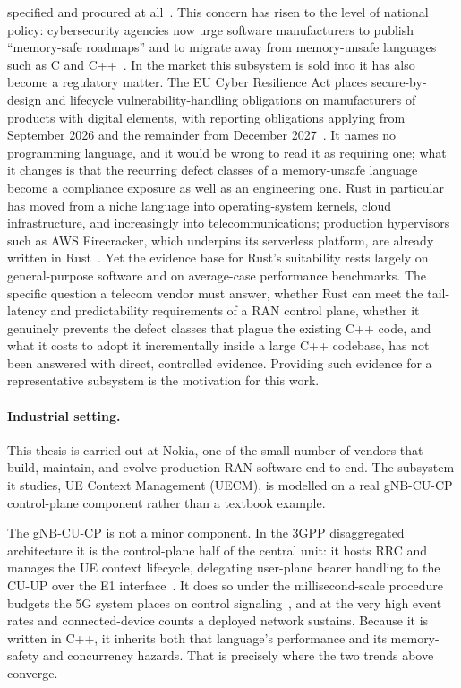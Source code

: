 \documentclass[english,twoside,openright,a4paper,censored,csm,software-track-2020]{HYthesisML}
\begin{document}
specified and procured at all~\cite{watson2025memorysafety}. This concern has risen to the level of national
policy: cybersecurity agencies now urge software manufacturers to publish ``memory-safe
roadmaps'' and to migrate away from memory-unsafe languages such as C and
C++~\cite{cisa2023memorysafe,oncd2024building}. In the market this subsystem is sold into it has
also become a regulatory matter. The EU Cyber Resilience Act places secure-by-design and
lifecycle vulnerability-handling obligations on manufacturers of products with digital elements,
with reporting obligations applying from September 2026 and the remainder from December
2027~\cite{eu2024cra}. It names no programming language, and it would be wrong to read it as
requiring one; what it changes is that the recurring defect classes of a memory-unsafe language
become a compliance exposure as well as an engineering one. Rust in particular has moved from a niche
language into operating-system kernels, cloud infrastructure, and increasingly into
telecommunications; production hypervisors such as AWS Firecracker, which underpins its
serverless platform, are already written in Rust~\cite{agache2020firecracker}. Yet the evidence base for Rust's suitability rests largely on
general-purpose software and on average-case performance benchmarks. The specific question a
telecom vendor must answer, whether Rust can meet the tail-latency and predictability
requirements of a RAN control plane, whether it genuinely prevents the defect classes that
plague the existing C++ code, and what it costs to adopt it incrementally inside a large C++
codebase, has not been answered with direct, controlled evidence. Providing such evidence
for a representative subsystem is the motivation for this work.

\paragraph{Industrial setting.}
This thesis is carried out at Nokia, one of the small number of vendors that build, maintain,
and evolve production RAN software end to end. The subsystem it studies, UE Context
Management (UECM), is modelled on a real gNB-CU-CP control-plane component rather than a
textbook example.

The gNB-CU-CP is not a minor component. In the 3GPP disaggregated architecture it is the
control-plane half of the central unit: it hosts RRC and manages the UE context lifecycle,
delegating user-plane bearer handling to the CU-UP over the E1
interface~\cite{3gpp38401,3gpp38300,3gpp38463,3gpp38331}. It does so under the
millisecond-scale procedure budgets the 5G system places on control
signaling~\cite{3gpp22261}, and at the very high event rates and connected-device counts a
deployed network sustains. Because it is written in C++, it inherits both that language's
performance and its memory-safety and concurrency hazards. That is precisely where the two
trends above converge.
\end{document}
